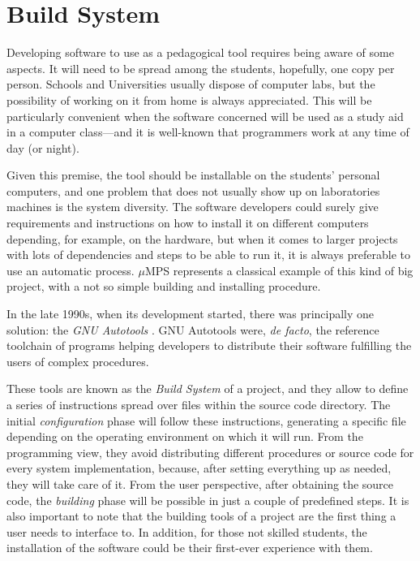\documentclass[12pt,a4paper,openright,twoside]{report}
\begin{document}
\section{Build System}
Developing software to use as a pedagogical tool requires being aware of some aspects.
It will need to be spread among the students, hopefully, one copy per person.
Schools and Universities usually dispose of computer labs, but the possibility of working on it from home is always appreciated.
This will be particularly convenient when the software concerned will be used as a study aid in a computer class---and it is well-known that programmers work at any time of day (or night).

Given this premise, the tool should be installable on the students' personal computers, and one problem that does not usually show up on laboratories machines is the system diversity.
The software developers could surely give requirements and instructions on how to install it on different computers depending, for example, on the hardware, but when it comes to larger projects with lots of dependencies and steps to be able to run it, it is always preferable to use an automatic process.
$\mu$MPS represents a classical example of this kind of big project, with a not so simple building and installing procedure.

In the late 1990s, when its development started, there was principally one solution: the \textit{GNU Autotools} \cite{autotools}.
GNU Autotools were, \textit{de facto}, the reference toolchain of programs helping developers to distribute their software fulfilling the users of complex procedures.

These tools are known as the \textit{Build System} of a project, and they allow to define a series of instructions spread over files within the source code directory.
The initial \textit{configuration} phase will follow these instructions, generating a specific file depending on the operating environment on which it will run.
From the programming view, they avoid distributing different procedures or source code for every system implementation, because, after setting everything up as needed, they will take care of it.
From the user perspective, after obtaining the source code, the \textit{building} phase will be possible in just a couple of predefined steps.
It is also important to note that the building tools of a project are the first thing a user needs to interface to.
In addition, for those not skilled students, the installation of the software could be their first-ever experience with them.
\end{document}

